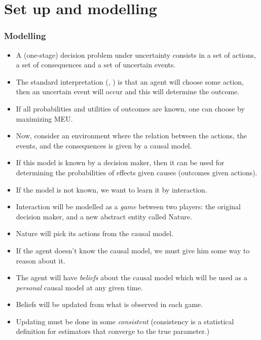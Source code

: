 \documentclass{beamer}
\theoremstyle{plain}
\begin{document}
\section{Set up and modelling}
\begin{frame}[allowframebreaks]
\frametitle{Modelling}
\begin{itemize}
\item A (one-stage) decision problem under uncertainty consists in a set of actions, a set of consequences and a set of uncertain events.
\item The standard interpretation (\cite{bernardo2000bayesian}, \cite{gilboa2009decision}) is that an agent will choose some action, then an uncertain event will occur and this will determine the outcome.
\item If all probabilities and utilities of outcomes are known, one can choose by maximizing MEU.

\end{itemize}
\end{frame}
\begin{frame}
\begin{itemize}
\item Now, consider an environment where the relation between the actions, the events, and the consequences is given by a causal model.
\item If this model is known by a decision maker, then it can be used for determining the probabilities of effects given causes (outcomes given actions).
\item If the model is not known, we want to learn it by interaction.
\end{itemize}
\end{frame}
\begin{frame}
\begin{itemize}
\item Interaction will be modelled as a \textit{game} between two players: the original decision maker, and a new abstract entity called Nature.
\item Nature will pick its actions from the causal model.
\end{itemize}
\end{frame}
\begin{frame}
\begin{itemize}
\item If the agent doesn't know the causal model, we must give him some way to reason about it.
\item The agent will have \textit{beliefs} about the causal model which will be used as a \textit{personal} causal model at any given time.
\item Beliefs will be updated from what is observed in each game.
\item Updating must be done in some \textit{consistent} (consistency is a statistical definition for estimators that converge to the true parameter.)
\end{itemize}
\end{frame}
\end{document}
